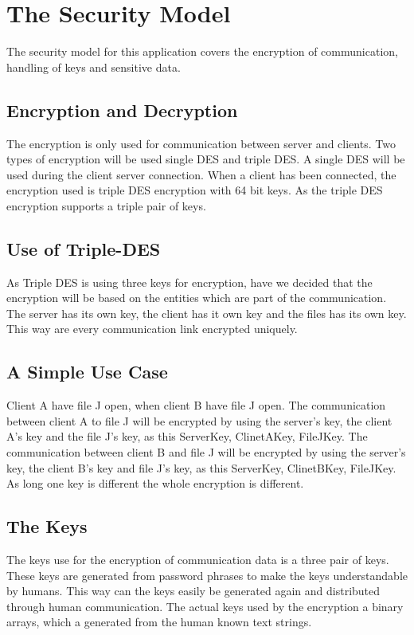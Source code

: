 \section{The Security Model}

The security model for this application covers the encryption of communication, handling of keys and sensitive data. 

\subsection{Encryption and Decryption}

The encryption is only used for communication between server and clients. Two types of encryption will be used single DES and triple DES. A single DES will be used during the client server connection. When a client has been connected, the encryption used is triple DES encryption with 64 bit keys. As the triple DES encryption supports a triple pair of keys. 

\subsection{Use of Triple-DES}

As Triple DES is using three keys for encryption, have we decided that the encryption will be based on the entities which are part of the communication. The server has its own key, the client has it own key and the files has its own key. This way are every communication link encrypted uniquely.

\subsection{A Simple Use Case}

Client A have file J open, when client B have file J open. The communication between client A to file J will be encrypted by using the server’s key, the client A’s key and the file J’s key, as this {ServerKey, ClinetAKey, FileJKey}. The communication between client B and file J will be encrypted by using the server’s key, the client B’s key and file J’s key, as this {ServerKey, ClinetBKey, FileJKey}. As long one key is different the whole encryption is different. 

\subsection{The Keys}

The keys use for the encryption of communication data is a three pair of keys. These keys are generated from password phrases to make the keys understandable by humans. This way can the keys easily be generated again and distributed through human communication. The actual keys used by the encryption a binary arrays, which a generated from the human known text strings. 

